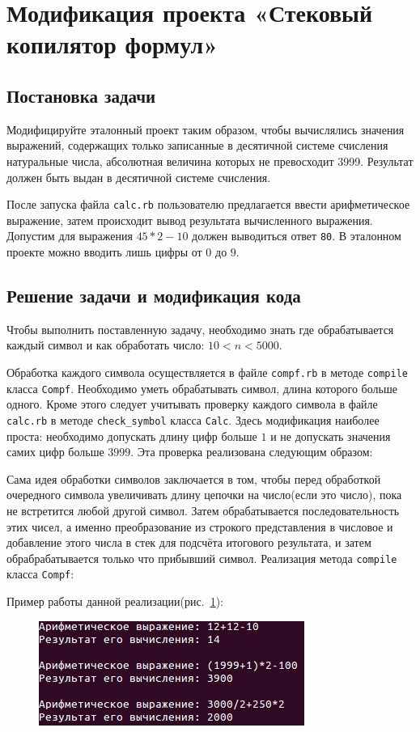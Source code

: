 \section{Модификация проекта «Стековый копилятор формул»}
\subsection{Постановка задачи}

Модифицируйте эталонный проект таким образом, чтобы вычислялись 
значения выражений, содержащих только записанные в десятичной системе 
счисления натуральные числа, абсолютная величина которых 
не превосходит 3999. Результат должен быть выдан 
в десятичной системе счисления.

После запуска файла \verb|calc.rb| пользователю предлагается ввести 
арифметическое выражение, затем происходит вывод результата 
вычисленного выражения. Допустим для выражения $45*2-10$ должен 
выводиться ответ \verb|80|. В эталонном проекте можно вводить 
лишь цифры от $0$ до $9$.

\subsection{Решение задачи и модификация кода}

Чтобы выполнить поставленную задачу, необходимо знать где 
обрабатывается каждый символ и как 
обработать число: $10 < n < 5000$.

Обработка каждого символа осуществляется в файле \verb|compf.rb| 
в методе \verb|compile| класса \verb|Compf|. Необходимо уметь 
обрабатывать символ, длина которого больше одного. Кроме этого следует 
учитывать проверку каждого символа в файле \verb|calc.rb| 
в методе \verb|check_symbol| класса \verb|Calc|. Здесь модификация 
наиболее проста: необходимо допускать длину цифр больше $1$ и 
не допускать значения самих цифр больше $3999$. Эта проверка 
реализована следующим образом:
\begin{small}

\end{small}

Сама идея обработки символов заключается в том, чтобы перед обработкой 
очередного символа увеличивать длину цепочки на число(если это число), 
пока не встретится любой другой символ. Затем обрабатывается 
последовательность этих чисел, а именно преобразование из 
строкого представления в числовое и добавление этого числа в стек 
для подсчёта итогового результата, и затем обрабрабатывается только 
что прибывший символ. Реализация метода \verb|compile| 
класса \verb|Compf|:
\begin{small}

\end{small}

Пример работы данной реализации(рис.~\ref{fig:example_calc}):
\begin{figure}[ht!]
\begin{center}
\includegraphics[scale=0.6]{images/example_calc}
\end{center}
\vspace*{-8mm}
\caption{}\label{fig:example_calc}
\end{figure}
